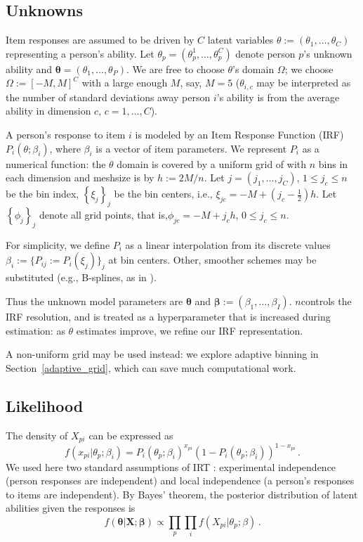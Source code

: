 \documentclass{article}
\newcommand{\bX}{\mathbf{X}}
\newcommand{\ta}{\theta}
\newcommand{\bbeta}{\boldsymbol\beta}
\newcommand{\bta}{\boldsymbol\ta}
\begin{document}
\subsection{Unknowns}
Item responses are assumed to be driven by $C$ latent variables $\ta := (\ta_1,\dots,\ta_C)$ representing a person's ability. Let $\ta_p=(\ta_p^1,\dots,\ta_p^C)$ denote person $p$'s unknown ability and $\bta = (\ta_1,\dots,\ta_P)$. We are free to choose $\ta$'s domain $\Omega$; we choose $\Omega := [-M,M]^C$ with a large enough $M$, say, $M = 5$ ($\ta_{i,c}$ may be interpreted as the number of standard deviations away person $i$'s ability is from the average ability in dimension $c$, $c=1,\dots,C$).

A person's response to item $i$ is modeled by an Item Response Function (IRF) $P_i(\ta;\beta_i)$, where $\beta_i$ is a vector of item parameters. We represent $P_i$ as a numerical function: the $\ta$ domain is covered by a uniform grid of with $n$ bins in each dimension and meshsize is by $h := 2 M / n$. Let $j=(j_1,\dots,j_C)$, $1 \leq j_c \leq n$ be the bin index, $\left\{\xi_j \right\}_j$ be the bin centers, i.e., $\xi_{jc} = -M + (j_c - \frac12) h$. Let $\left\{\phi_j\right\}_j$ denote all grid points, that is,$\phi_{jc} = -M + j_c h$, $0 \leq j_c \leq n$.

For simplicity, we define $P_i$ as a linear interpolation from its discrete values $\beta_i := \{P_{ij} := P_i(\xi_j)\}_j$ at bin centers. Other, smoother schemes may be substituted (e.g., B-splines, as in \cite{matt_bsplines}).

Thus the unknown model parameters are $\bta$ and $\bbeta := (\beta_1,\dots,\beta_I)$. $n$controls the IRF resolution, and is treated as a hyperparameter that is increased during estimation: as $\ta$ estimates improve, we refine our IRF representation.

A non-uniform grid may be used instead: we explore adaptive binning in Section~\ref{adaptive_grid}, which can save much computational work. 

\subsection{Likelihood}
The density of $X_{pi}$ can be expressed as 
\begin{equation}
  f(x_{pi}|\ta_p;\beta_i) = P_i(\ta_p;\beta_i)^{x_{pi}} \left(1 - P_i(\ta_p;\beta_i)\right)^{1-x_{pi}}\,.
\end{equation}
We used here two standard assumptions of IRT \cite{junker}: experimental independence (person responses are independent) and local independence (a person's responses to items are independent). By Bayes' theorem, the posterior distribution of latent abilities given the responses is
\begin{equation}
  f(\bta|\bX;\bbeta) \propto\prod_p \prod_i f(X_{pi}|\ta_p;\beta)\,.
  \label{like}
\end{equation}
\end{document}
